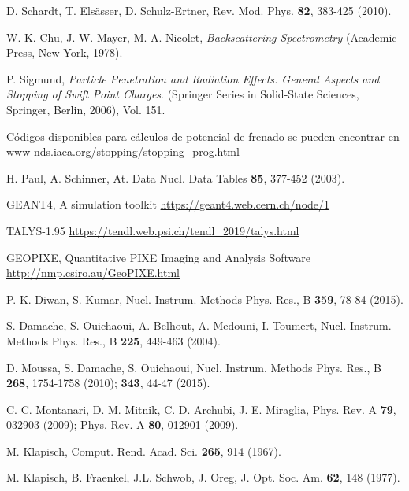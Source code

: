 \begin{thebibliography}{9}
D. Schardt, T. Els\"asser, D. Schulz-Ertner, 
Rev. Mod. Phys. \textbf{82},  383-425 (2010).

W. K. Chu, J. W. Mayer, M. A. Nicolet,
\textit{Backscattering Spectrometry}
(Academic Press, New York, 1978).

P. Sigmund, 
\textit{Particle Penetration and Radiation Effects. General Aspects and 
Stopping of Swift Point Charges}.
(Springer Series in Solid-State Sciences, Springer, Berlin, 2006), 
Vol. 151.

Códigos disponibles para cálculos de potencial de frenado se pueden 
encontrar en 
\href{https://www-nds.iaea.org/stopping/stopping\_prog.html}
{www-nds.iaea.org/stopping/stopping\_prog.html}

H. Paul, A. Schinner,
At. Data Nucl. Data Tables  \textbf{85}, 377-452 (2003).

GEANT4, A simulation toolkit 
\href{https://geant4.web.cern.ch/node/1}
{https://geant4.web.cern.ch/node/1}

TALYS-1.95 \href{https://tendl.web.psi.ch/tendl\_2019/talys.html}
{https://tendl.web.psi.ch/tendl\_2019/talys.html}

GEOPIXE, Quantitative PIXE Imaging and Analysis Software 
\href{http://nmp.csiro.au/GeoPIXE.html}
{http://nmp.csiro.au/GeoPIXE.html}

P. K. Diwan, S. Kumar, 
Nucl. Instrum. Methods Phys. Res., B \textbf{359}, 78-84 (2015).

S. Damache, S. Ouichaoui, A. Belhout, A. Medouni, I. Toumert, 
Nucl. Instrum. Methods Phys. Res., B \textbf{225}, 449-463 (2004).

D. Moussa, S. Damache, S. Ouichaoui, 
Nucl. Instrum. Methods Phys. Res., B \textbf{268}, 1754-1758 (2010); 
\textbf{343},  44-47 (2015).

C. C. Montanari, D. M. Mitnik, C. D. Archubi, J. E. Miraglia, 
Phys. Rev. A \textbf{79}, 032903 (2009); 
Phys. Rev. A \textbf{80}, 012901 (2009).

M. Klapisch,
Comput. Rend. Acad. Sci. \textbf{265}, 914 (1967).

M. Klapisch, B. Fraenkel, J.L. Schwob, J. Oreg,
J. Opt. Soc. Am. \textbf{62}, 148 (1977).


\end{thebibliography}
